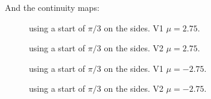 \documentclass[../main.tex]{subfiles}
\begin{document}
And the continuity maps:
\begin{figure}[H]
    \centering
    
    \caption{using a start of $\pi/3$ on the sides. V1 $\mu = 2.75$.}
\end{figure}
\begin{figure}[H]
    \centering
    
    \caption{using a start of $\pi/3$ on the sides. V2 $\mu = 2.75$.}
\end{figure}

\begin{figure}[H]
    \centering
    
    \caption{using a start of $\pi/3$ on the sides. V1 $\mu = -2.75$.}
\end{figure}
\begin{figure}[H]
    \centering
    
    \caption{using a start of $\pi/3$ on the sides. V2 $\mu = -2.75$.}
\end{figure}
\end{document}
